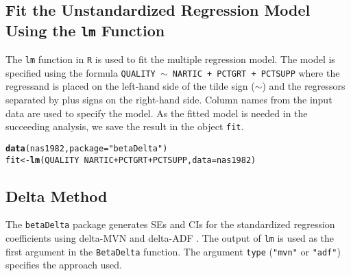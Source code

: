 \documentclass[man]{apa7}\usepackage[]{graphicx}\usepackage[]{xcolor}
\makeatletter
\newcommand{\hlstr}[1]{\textcolor[rgb]{0.192,0.494,0.8}{#1}}%
\newcommand{\hlopt}[1]{\textcolor[rgb]{0,0,0}{#1}}%
\newcommand{\hlstd}[1]{\textcolor[rgb]{0.345,0.345,0.345}{#1}}%
\newcommand{\hlkwb}[1]{\textcolor[rgb]{0.69,0.353,0.396}{#1}}%
\newcommand{\hlkwc}[1]{\textcolor[rgb]{0.333,0.667,0.333}{#1}}%
\newcommand{\hlkwd}[1]{\textcolor[rgb]{0.737,0.353,0.396}{\textbf{#1}}}%
\newenvironment{kframe}{%
 \def\at@end@of@kframe{}%
 \ifinner\ifhmode%
  \def\at@end@of@kframe{\end{minipage}}%
  \begin{minipage}{\columnwidth}%
 \fi\fi%
 \def\FrameCommand##1{\hskip\@totalleftmargin \hskip-\fboxsep
 \colorbox{shadecolor}{##1}\hskip-\fboxsep
     \hskip-\linewidth \hskip-\@totalleftmargin \hskip\columnwidth}%
 \MakeFramed {\advance\hsize-\width
   \@totalleftmargin\z@ \linewidth\hsize
   \@setminipage}}%
 {\par\unskip\endMakeFramed%
 \at@end@of@kframe}
\newenvironment{knitrout}{}{} %
\makeatother
\begin{document}
\subsection{Fit the Unstandardized Regression Model Using the \texttt{lm} Function}

The \texttt{lm} function in \texttt{R} is used
to fit the multiple regression model.
The model is specified using the formula
\texttt{QUALITY $\sim$ NARTIC + PCTGRT + PCTSUPP}
where the regressand is placed on the left-hand side of the tilde sign
(\texttt{$\sim$})
and the regressors separated by plus signs on the right-hand side.
Column names from the input data are used to specify the model.
As the fitted model is needed in the succeeding analysis,
we save the result in the object \texttt{fit}.

\vspace{-.5em}
\begin{minipage}{.75\linewidth}
	\singlespacing
\begin{knitrout}\scriptsize
{}\color{fgcolor}\begin{kframe}
\begin{alltt}
\hlkwd{data}\hlstd{(nas1982,} \hlkwc{package} \hlstd{=} \hlstr{"betaDelta"}\hlstd{)}
\hlstd{fit} \hlkwb{<-} \hlkwd{lm}\hlstd{(QUALITY} \hlopt{~} \hlstd{NARTIC} \hlopt{+} \hlstd{PCTGRT} \hlopt{+} \hlstd{PCTSUPP,} \hlkwc{data} \hlstd{= nas1982)}
\end{alltt}
\end{kframe}
\end{knitrout}
\end{minipage}

\subsection{Delta Method}

The \texttt{betaDelta} package
generates SEs and CIs
for the standardized regression coefficients
using delta-MVN
\parencite{Lib-Regression-Standardized-Coefficients-Delta-Yuan-2011}
and
delta-ADF
\parencite{Lib-Regression-Standardized-Coefficients-Delta-Jones-2015}.
The output of \texttt{lm}
is used as the first argument in the  \texttt{BetaDelta} function.
The argument \texttt{type} (\texttt{"mvn"} or \texttt{"adf"})
specifies the approach used.
\end{document}
